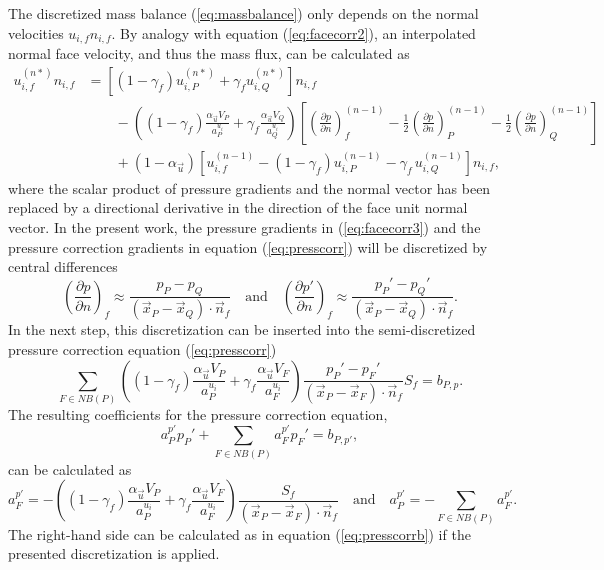 The discretized mass balance (\ref{eq:massbalance}) only depends on the normal velocities \(u_{i,f} n_{i,f}\). By analogy with equation (\ref{eq:facecorr2}), an interpolated normal face velocity, and thus the mass flux, can be calculated as
\begin{align}
  \label{eq:facecorr3}
  u_{i,f}^{(n*)} n_{i,f}
  &=
  \left[\left(1 - \gamma_f\right) u_{i,P}^{(n*)} + \gamma_f u_{i,Q}^{(n*)} \right]n_{i,f} \nonumber\\[1em]
  &\quad\quad - 
  \left(\left(1 - \gamma_f\right) \frac{\alpha_\vec{u} V_P}{a_P^{u_i}} + \gamma_f \frac{\alpha_\vec{u} V_Q}{a_Q^{u_i}}\right)
  \left[ 
  \left(\frac{\partial p}{\partial n}\right)_f^{(n-1)} 
  -  \frac{1}{2} \left( \frac{\partial p}{\partial n} \right)_P^{(n-1)} 
  -  \frac{1}{2} \left(\frac{\partial p}{\partial n}\right)_Q^{(n-1)} 
\right] \nonumber \\[1em]
&\quad\quad + \left(1 - \alpha_\vec{u}\right) \left[ u_{i,f}^{(n-1)} - \left(1 - \gamma_f\right) u_{i,P}^{(n-1)} - \gamma_f \, u_{i,Q}^{(n-1)} \right] n_{i,f},
\end{align}
where the scalar product of pressure gradients and the normal vector has been replaced by a directional derivative in the direction of the face unit normal vector. In the present work, the pressure gradients in (\ref{eq:facecorr3}) and the pressure correction gradients in equation (\ref{eq:presscorr}) will be discretized by central differences
\begin{displaymath}
\left(\frac{\partial p}{\partial n}\right)_f \approx \frac{p_P - p_Q}{\left(\vec{x}_P - \vec{x}_Q\right)\cdot \vec{n}_f} 
\quad \text{and} \quad 
\left(\frac{\partial p'}{\partial n}\right)_f \approx \frac{p_P' - p_Q'}{\left(\vec{x}_P - \vec{x}_Q\right)\cdot \vec{n}_f}.
\end{displaymath}
In the next step, this discretization can be inserted into the semi-discretized pressure correction equation (\ref{eq:presscorr}) 
\begin{displaymath}
  \sum_{F \in NB(P)} \left(\left(1 - \gamma_f\right) \frac{\alpha_\vec{u} V_P}{a_P^{u_i}} + \gamma_f \frac{\alpha_\vec{u} V_F}{a_F^{u_i}}\right)
   \frac{p_P' - p_F'}{\left(\vec{x}_P - \vec{x}_F\right)\cdot \vec{n}_f} S_f
  = b_{P,p}.
\end{displaymath}
The resulting coefficients for the pressure correction equation,
\begin{displaymath}
  a_P^{p'} p_{P}' + \sum_{F \in NB(P)} a_F^{p'} p_{F}' = b_{P,p'},
\end{displaymath}
can be calculated as
\begin{equation}
  \label{eq:segpresscorrcoeff}
  a_F^{p'} = -\left(\left(1 - \gamma_f\right) \frac{\alpha_\vec{u} V_P}{a_P^{u_i}} + \gamma_f \frac{\alpha_\vec{u} V_F}{a_F^{u_i}}\right) \frac{S_f}{\left(\vec{x}_P - \vec{x}_F\right) \cdot \vec{n}_f} \quad \text{and} \quad
  a_P^{p'} = - \sum_{F \in NB(P)} a_F^{p'}.
\end{equation}
The right-hand side can be calculated as in equation (\ref{eq:presscorrb}) if the presented discretization is applied. 

